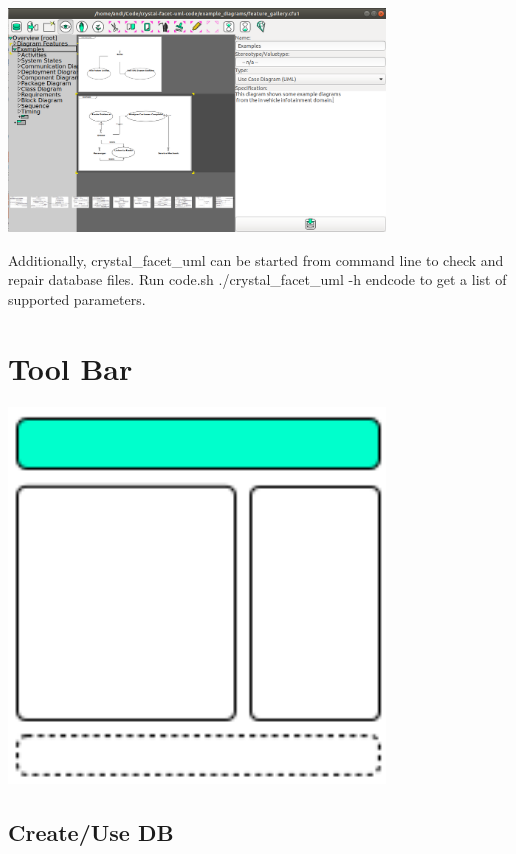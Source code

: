 \includegraphics[width=10cm]{screenshot_1.png}

Additionally, crystal\_facet\_uml can be started from command line
to check and repair database files.
Run
code{.sh}
./crystal\_facet\_uml -h
endcode
to get a list of supported parameters.

\section{Tool Bar}

\includegraphics[width=10cm]{main_window_sketch_1.png}

\subsection{Create/Use DB}

